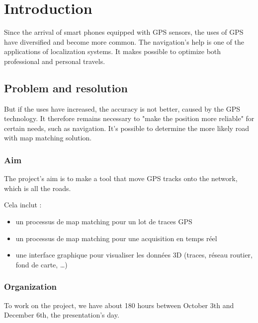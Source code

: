 \chapter{Introduction}

Since the arrival of smart phones equipped with GPS sensors, the uses of GPS have diversified and become more common.
The navigation's help is one of the applications of localization systems. It makes possible to optimize both professional and personal travels.

\section{Problem and resolution}

But if the uses have increased, the accuracy is not better, caused by the GPS technology. It therefore remains necessary to "make the position more reliable" for certain needs, such as navigation.
It's possible to determine the more likely road with map matching solution.

\subsection{Aim}

The project's aim is to make a tool that move GPS tracks onto the network, which is all the roads.

Cela inclut :
\begin{itemize}
\item{} un processus de map matching pour un lot de traces GPS
\item{} un processus de map matching pour une acquisition en temps réel
\item{} une interface graphique pour visualiser les données 3D (traces, réseau routier, fond de carte, \dots)
\end{itemize}

\subsection{Organization}

To work on the project, we have about 180 hours between October 3th and December 6th, the presentation's day.

